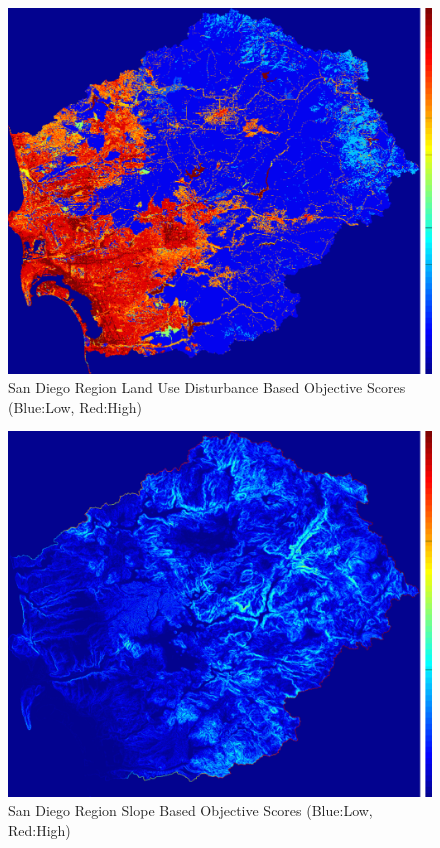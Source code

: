         \begin{figure}[!h]
            \begin{center}
            \includegraphics[width=5.5in]{figures/SanDiego_DisturbanceScore.png}   
            \caption{San Diego Region Land Use Disturbance Based Objective Scores (Blue:Low, Red:High)}
            \label{fig:SDdisturbance}
            \end{center}
        \end{figure}
        
        \begin{figure}[!h]
            \begin{center}
            \includegraphics[width=5.5in]{figures/SanDiego_SlopeScore.png}   
            \caption{San Diego Region Slope Based Objective Scores (Blue:Low, Red:High)}
            \label{fig:SDslope}
            \end{center}
        \end{figure}
        
